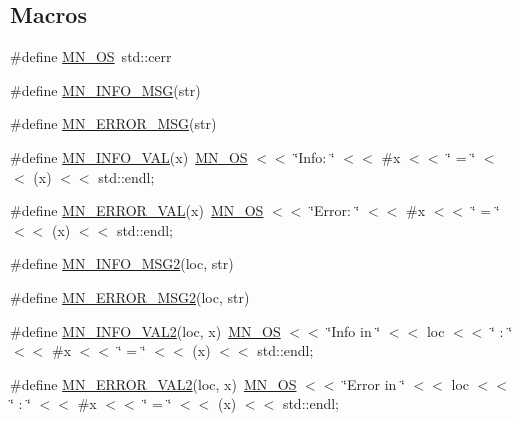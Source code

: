 \subsection*{Macros}
\begin{DoxyCompactItemize}
\item 
\#define \mbox{\hyperlink{adat-devel_2other__libs_2minuit_2inc_2Minuit2_2MnPrint_8h_af76e3743f54c9064bb3fb3270edf5896}{M\+N\+\_\+\+OS}}~std\+::cerr
\item 
\#define \mbox{\hyperlink{adat-devel_2other__libs_2minuit_2inc_2Minuit2_2MnPrint_8h_a4e66246e4dc11f5e246436edd0634197}{M\+N\+\_\+\+I\+N\+F\+O\+\_\+\+M\+SG}}(str)
\item 
\#define \mbox{\hyperlink{adat-devel_2other__libs_2minuit_2inc_2Minuit2_2MnPrint_8h_af19c456f414c1f519cda4dfe82a4c4c7}{M\+N\+\_\+\+E\+R\+R\+O\+R\+\_\+\+M\+SG}}(str)
\item 
\#define \mbox{\hyperlink{adat-devel_2other__libs_2minuit_2inc_2Minuit2_2MnPrint_8h_ab5c510861f147ef9457074ec0ed1817c}{M\+N\+\_\+\+I\+N\+F\+O\+\_\+\+V\+AL}}(x)~\mbox{\hyperlink{adat__devel__install_2include_2Minuit2_2MnPrint_8h_af76e3743f54c9064bb3fb3270edf5896}{M\+N\+\_\+\+OS}} $<$$<$ \char`\"{}Info\+: \char`\"{} $<$$<$ \#x $<$$<$ \char`\"{} = \char`\"{} $<$$<$ (x) $<$$<$ std\+::endl;
\item 
\#define \mbox{\hyperlink{adat-devel_2other__libs_2minuit_2inc_2Minuit2_2MnPrint_8h_a236fe6bdf05c0edfe8d47c368a6384af}{M\+N\+\_\+\+E\+R\+R\+O\+R\+\_\+\+V\+AL}}(x)~\mbox{\hyperlink{adat__devel__install_2include_2Minuit2_2MnPrint_8h_af76e3743f54c9064bb3fb3270edf5896}{M\+N\+\_\+\+OS}} $<$$<$ \char`\"{}Error\+: \char`\"{} $<$$<$ \#x $<$$<$ \char`\"{} = \char`\"{} $<$$<$ (x) $<$$<$ std\+::endl;
\item 
\#define \mbox{\hyperlink{adat-devel_2other__libs_2minuit_2inc_2Minuit2_2MnPrint_8h_a2f47633184e2b69be43e445e5ae1dba4}{M\+N\+\_\+\+I\+N\+F\+O\+\_\+\+M\+S\+G2}}(loc,  str)
\item 
\#define \mbox{\hyperlink{adat-devel_2other__libs_2minuit_2inc_2Minuit2_2MnPrint_8h_aa9b8356784d956dfc10ab2a6ff4f6264}{M\+N\+\_\+\+E\+R\+R\+O\+R\+\_\+\+M\+S\+G2}}(loc,  str)
\item 
\#define \mbox{\hyperlink{adat-devel_2other__libs_2minuit_2inc_2Minuit2_2MnPrint_8h_a1ee56f7f1e6b1358861d449482e3eea4}{M\+N\+\_\+\+I\+N\+F\+O\+\_\+\+V\+A\+L2}}(loc,  x)~\mbox{\hyperlink{adat__devel__install_2include_2Minuit2_2MnPrint_8h_af76e3743f54c9064bb3fb3270edf5896}{M\+N\+\_\+\+OS}} $<$$<$ \char`\"{}Info in \char`\"{} $<$$<$ loc $<$$<$ \char`\"{} \+: \char`\"{} $<$$<$ \#x $<$$<$ \char`\"{} = \char`\"{} $<$$<$ (x) $<$$<$ std\+::endl;
\item 
\#define \mbox{\hyperlink{adat-devel_2other__libs_2minuit_2inc_2Minuit2_2MnPrint_8h_adad659d3bfe55e69e89c0cb1da6b4cd2}{M\+N\+\_\+\+E\+R\+R\+O\+R\+\_\+\+V\+A\+L2}}(loc,  x)~\mbox{\hyperlink{adat__devel__install_2include_2Minuit2_2MnPrint_8h_af76e3743f54c9064bb3fb3270edf5896}{M\+N\+\_\+\+OS}} $<$$<$ \char`\"{}Error in \char`\"{} $<$$<$ loc $<$$<$ \char`\"{} \+: \char`\"{} $<$$<$ \#x $<$$<$ \char`\"{} = \char`\"{} $<$$<$ (x) $<$$<$ std\+::endl;
\end{DoxyCompactItemize}
